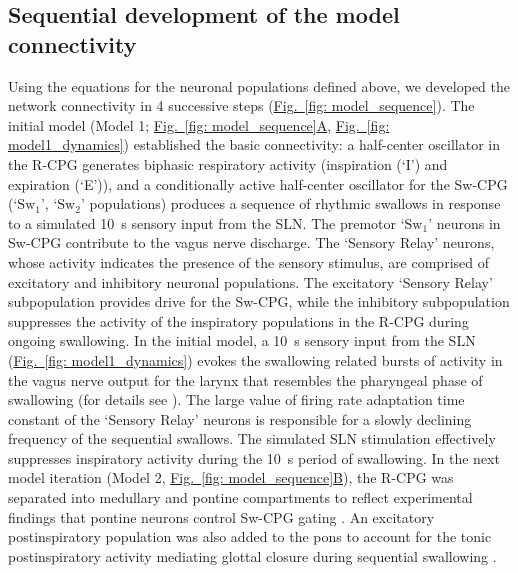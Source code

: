 \documentclass[pdflatex,sn-mathphys-ay]{sn-jnl}%
\renewcommand{\figureautorefname}{Fig.}
\newcommand{\Figref}[2][]{\hyperref[#2]{\figureautorefname~\ref*{#2}#1}}
\theoremstyle{thmstyleone}%
\theoremstyle{thmstyletwo}%
\theoremstyle{thmstylethree}%
\begin{document}
\subsection{Sequential development of the model connectivity}
Using the equations for the neuronal populations defined above, we developed the network connectivity in 4 successive steps (\Figref[]{fig: model_sequence}). 
The initial model (Model 1; \Figref[A]{fig: model_sequence}, \Figref[]{fig: model1_dynamics}) established the basic connectivity: a half-center oscillator in the R-CPG generates biphasic respiratory activity (inspiration (`I') and expiration (`E')), and a conditionally active half-center oscillator for the Sw-CPG (`$\text{Sw}_1$', `$\text{Sw}_2$' populations) produces a sequence of rhythmic swallows in response to a simulated 10~s sensory input from the SLN. The premotor `$\text{Sw}_1$' neurons in Sw-CPG contribute to the vagus nerve discharge. The ‘Sensory Relay’ neurons, whose activity indicates the presence of the sensory stimulus, are comprised of excitatory and inhibitory neuronal populations. The excitatory `Sensory Relay' subpopulation provides drive for the Sw-CPG, while the inhibitory subpopulation suppresses the activity of the inspiratory populations in the R-CPG during ongoing swallowing. In the initial model, a 10~s sensory input from the SLN (\Figref[]{fig: model1_dynamics}) evokes the swallowing related bursts of activity in the vagus nerve output for the larynx that resembles the pharyngeal phase of swallowing (for details see \citep{jean2001brain, bautista2014ponto, lang2009brain}). The large value of firing rate adaptation time constant of the `Sensory Relay' neurons is responsible for a slowly declining frequency of the sequential swallows. The simulated SLN stimulation effectively suppresses inspiratory activity during the 10~s period of swallowing.
In the next model iteration (Model 2, \Figref[B]{fig: model_sequence}), the R-CPG was separated into medullary and pontine compartments to reflect experimental findings that pontine neurons control Sw-CPG gating \citep{bautista2014ponto}. An excitatory postinspiratory population was also added to the pons to account for the tonic postinspiratory activity mediating glottal closure during sequential swallowing \citep{bautista2014ponto}.
\end{document}

